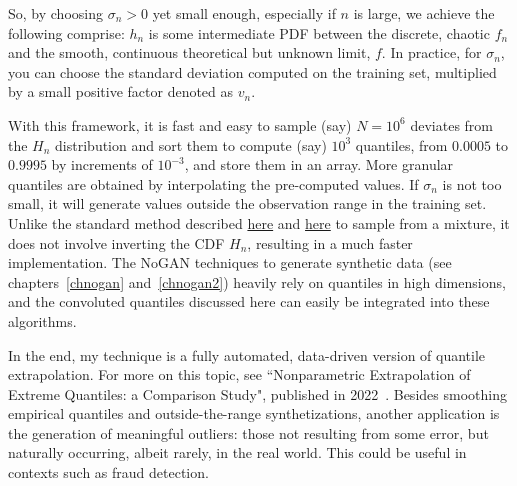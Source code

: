 \documentclass[oneside,10pt]{book}
\begin{document}
So, by choosing $\sigma_n > 0$ yet small enough, especially if $n$ is large, we achieve the 
 following comprise: $h_n$ is some intermediate PDF between the discrete, chaotic $f_n$ and the smooth, continuous theoretical but unknown limit, $f$. In practice, for $\sigma_n$, you can choose the standard deviation computed on the training set, multiplied by a small positive factor denoted as $v_n$.


With this framework, it is fast and easy to sample (say) $N=10^6$ deviates from the $H_n$ distribution and sort them to compute (say) $10^3$ quantiles, from $0.0005$ to $0.9995$ by increments of $10^{-3}$, and store them in an array. 
More granular quantiles are obtained by interpolating the pre-computed values. 
If $\sigma_n$ is not too small, it will generate values outside the observation range in the training set.
 Unlike the standard method described 
\href{http://www.awebb.info/probability/2017/05/12/quantiles-of-mixture-distributions.html}{here} and 
\href{https://www.jamesatkins.net/posts/quantile-function-of-mixture-distributions-in-python/}{here} 
to sample from a mixture, it does not involve inverting the CDF $H_n$, resulting
 in a much faster implementation.  The NoGAN 
techniques to generate \textcolor{index}{synthetic data} (see  chapters~\ref{chnogan} and~\ref{chnogan2}) heavily rely on quantiles in high dimensions, and the convoluted quantiles discussed here can easily be
 integrated into these algorithms.

In the end, my technique is a fully automated, data-driven version of
 \textcolor{index}{quantile extrapolation}. For more on this topic,
 see ``Nonparametric Extrapolation of Extreme Quantiles: a Comparison Study",
 published in 2022~\cite{pcper43w}. Besides smoothing empirical quantiles and outside-the-range
 synthetizations, another application is the generation of meaningful outliers: those not
 resulting from some error, but naturally occurring, albeit rarely, in the real world. This could
 be useful in contexts such as fraud detection.
\end{document}
